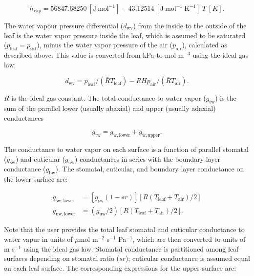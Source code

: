 \documentclass[11pt, oneside]{article}
\begin{document}
\begin{equation}
  h_\mathrm{vap} = 56847.68250~[\mathrm{J~mol}^{-1}] - 43.12514~[\mathrm{J~mol}^{-1}~\mathrm{K}^{-1}]~T~[K].
\end{equation}

The water vapour pressure differential ($d_\mathrm{wv}$) from the inside to the outside of the leaf is the water vapor pressure inside the leaf, which is assumed to be saturated ($p_\mathrm{leaf} = p_\mathrm{sat}$), minus the water vapor pressure of the air ($p_\mathrm{air}$), calculated as described above. This value is converted from kPa to mol m$^{-3}$ using the ideal gas law:

\begin{equation}
  \label{eq:d_wv}
  d_\mathrm{wv} = p_\mathrm{leaf} / (\bar{R} T_\mathrm{leaf}) - RH p_\mathrm{air} / (\bar{R} T_\mathrm{air}).
\end{equation}

$\bar{R}$ is the ideal gas constant. The total conductance to water vapor ($g_\mathrm{tw}$) is the sum of the parallel lower (usually abaxial) and upper (usually adaxial) conductances

\begin{equation}
  \label{eq:g_tw}
  g_\mathrm{tw} = g_\mathrm{w,lower} + g_\mathrm{w,upper}.
\end{equation} 

The conductance to water vapor on each surface is a function of parallel stomatal ($g_\mathrm{sw}$) and cuticular ($g_\mathrm{uw}$) conductances in series with the boundary layer conductance ($g_\mathrm{bw}$). The stomatal, cuticular, and boundary layer conductance on the lower surface are:

\begin{align}
  g_\mathrm{sw,lower} & = [g_\mathrm{sw} (1 - \mathit{sr})] [R (T_\mathrm{leaf} + T_\mathrm{air}) / 2] \\
  g_\mathrm{uw,lower} & = (g_\mathrm{uw} / 2) [R (T_\mathrm{leaf} + T_\mathrm{air}) / 2].
\end{align}

Note that the user provides the total leaf stomatal and cuticular conductance to water vapur in units of $\mu$mol m$^{-2}$ s$^{-1}$ Pa$^{-1}$, which are then converted to units of m s$^{-1}$ using the ideal gas law. Stomatal conductance is partitioned among leaf surfaces depending on stomatal ratio ($\mathit{sr}$); cuticular conductance is assumed equal on each leaf surface. The corresponding expressions for the upper surface are:
\end{document}
